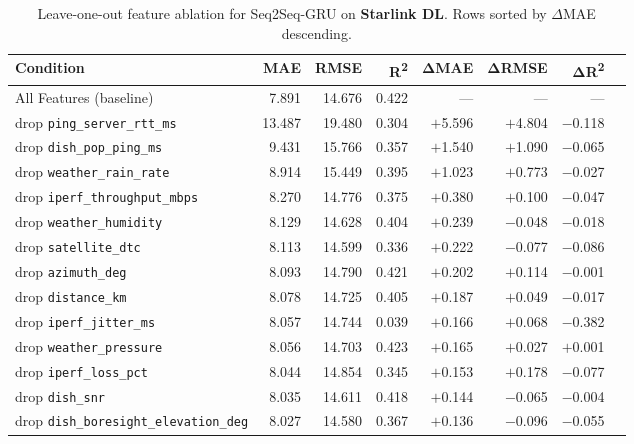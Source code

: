 \documentclass[12pt]{article}
\begin{document}
\begin{table}[ht]
\centering
\caption{Leave-one-out feature ablation for Seq2Seq-GRU on \textbf{Starlink DL}.
Rows sorted by $\Delta$MAE descending.}
\label{tab:ablation_starlink}
\setlength{\tabcolsep}{4pt}
\renewcommand{\arraystretch}{1.12}
\small
\begin{tabular}{lrrrrrrr}
\toprule
\textbf{Condition} & \textbf{MAE} & \textbf{RMSE} & \textbf{R\textsuperscript{2}}
  & $\boldsymbol{\Delta}$\textbf{MAE} & $\boldsymbol{\Delta}$\textbf{RMSE} & $\boldsymbol{\Delta}$\textbf{R\textsuperscript{2}} \\
\midrule
All Features (baseline) & 7.891 & 14.676 & 0.422 & --- & --- & --- \\
\midrule
drop \texttt{ping\_server\_rtt\_ms}         & 13.487 & 19.480 & 0.304 & $+$5.596 & $+$4.804 & $-$0.118 \\
drop \texttt{dish\_pop\_ping\_ms}           & 9.431  & 15.766 & 0.357 & $+$1.540 & $+$1.090 & $-$0.065 \\
drop \texttt{weather\_rain\_rate}           & 8.914  & 15.449 & 0.395 & $+$1.023 & $+$0.773 & $-$0.027 \\
drop \texttt{iperf\_throughput\_mbps}       & 8.270  & 14.776 & 0.375 & $+$0.380 & $+$0.100 & $-$0.047 \\
drop \texttt{weather\_humidity}             & 8.129  & 14.628 & 0.404 & $+$0.239 & $-$0.048 & $-$0.018 \\
drop \texttt{satellite\_dtc}                & 8.113  & 14.599 & 0.336 & $+$0.222 & $-$0.077 & $-$0.086 \\
drop \texttt{azimuth\_deg}                  & 8.093  & 14.790 & 0.421 & $+$0.202 & $+$0.114 & $-$0.001 \\
drop \texttt{distance\_km}                  & 8.078  & 14.725 & 0.405 & $+$0.187 & $+$0.049 & $-$0.017 \\
drop \texttt{iperf\_jitter\_ms}             & 8.057  & 14.744 & 0.039 & $+$0.166 & $+$0.068 & $-$0.382 \\
drop \texttt{weather\_pressure}             & 8.056  & 14.703 & 0.423 & $+$0.165 & $+$0.027 & $+$0.001 \\
drop \texttt{iperf\_loss\_pct}              & 8.044  & 14.854 & 0.345 & $+$0.153 & $+$0.178 & $-$0.077 \\
drop \texttt{dish\_snr}                     & 8.035  & 14.611 & 0.418 & $+$0.144 & $-$0.065 & $-$0.004 \\
drop \texttt{dish\_boresight\_elevation\_deg}& 8.027 & 14.580 & 0.367 & $+$0.136 & $-$0.096 & $-$0.055 \\

\end{tabular}
\end{table}
\end{document}
